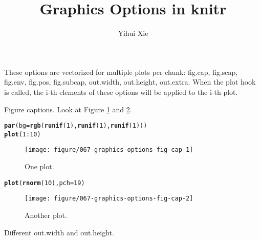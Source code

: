 \documentclass{article}\usepackage[]{graphicx}\usepackage[]{color}
\title{Graphics Options in knitr}
\author{Yihui Xie}
\makeatletter
\newcommand{\hlnum}[1]{\textcolor[rgb]{0.686,0.059,0.569}{#1}}%
\newcommand{\hlopt}[1]{\textcolor[rgb]{0,0,0}{#1}}%
\newcommand{\hlstd}[1]{\textcolor[rgb]{0.345,0.345,0.345}{#1}}%
\newcommand{\hlkwc}[1]{\textcolor[rgb]{0.333,0.667,0.333}{#1}}%
\newcommand{\hlkwd}[1]{\textcolor[rgb]{0.737,0.353,0.396}{\textbf{#1}}}%
\newenvironment{kframe}{%
 \def\at@end@of@kframe{}%
 \ifinner\ifhmode%
  \def\at@end@of@kframe{\end{minipage}}%
  \begin{minipage}{\columnwidth}%
 \fi\fi%
 \def\FrameCommand##1{\hskip\@totalleftmargin \hskip-\fboxsep
 \colorbox{shadecolor}{##1}\hskip-\fboxsep
     \hskip-\linewidth \hskip-\@totalleftmargin \hskip\columnwidth}%
 \MakeFramed {\advance\hsize-\width
   \@totalleftmargin\z@ \linewidth\hsize
   \@setminipage}}%
 {\par\unskip\endMakeFramed%
 \at@end@of@kframe}
\newenvironment{knitrout}{}{} %
\makeatother
\begin{document}
\maketitle



These options are vectorized for multiple plots per chunk: fig.cap, fig.scap, fig.env, fig.pos, fig.subcap, out.width, out.height, out.extra.
When the plot hook is called, the i-th elements of these options will be
applied to the i-th plot.

Figure captions. Look at Figure \ref{fig:fig-cap1} and \ref{fig:fig-cap2}.

\begin{knitrout}
\color{fgcolor}\begin{kframe}
\begin{alltt}
\hlkwd{par}\hlstd{(}\hlkwc{bg} \hlstd{=} \hlkwd{rgb}\hlstd{(}\hlkwd{runif}\hlstd{(}\hlnum{1}\hlstd{),} \hlkwd{runif}\hlstd{(}\hlnum{1}\hlstd{),} \hlkwd{runif}\hlstd{(}\hlnum{1}\hlstd{)))}
\hlkwd{plot}\hlstd{(}\hlnum{1}\hlopt{:}\hlnum{10}\hlstd{)}
\end{alltt}
\end{kframe}\begin{figure}[H]

\texttt{[image: figure/067-graphics-options-fig-cap-1]} \caption[One plot]{One plot.\label{fig:fig-cap1}}
\end{figure}

\begin{kframe}\begin{alltt}
\hlkwd{plot}\hlstd{(}\hlkwd{rnorm}\hlstd{(}\hlnum{10}\hlstd{),} \hlkwc{pch} \hlstd{=} \hlnum{19}\hlstd{)}
\end{alltt}
\end{kframe}\begin{figure}[H]

\texttt{[image: figure/067-graphics-options-fig-cap-2]} \caption[Another plot]{Another plot.\label{fig:fig-cap2}}
\end{figure}


\end{knitrout}

Different out.width and out.height.
\end{document}
